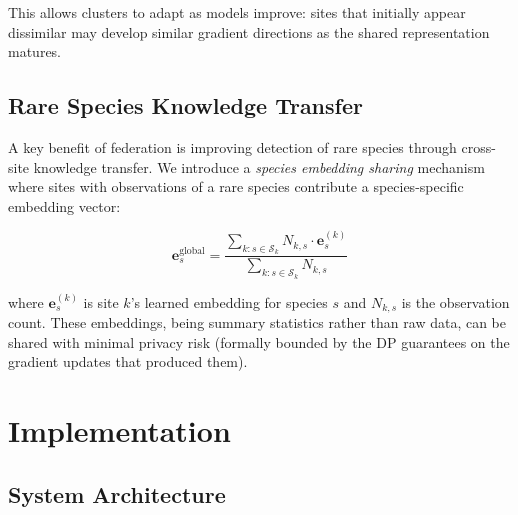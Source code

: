 \documentclass[11pt,a4paper]{article}
\begin{document}
This allows clusters to adapt as models improve: sites that initially appear dissimilar may develop similar gradient directions as the shared representation matures.

\subsection{Rare Species Knowledge Transfer}

A key benefit of federation is improving detection of rare species through cross-site knowledge transfer.
We introduce a \emph{species embedding sharing} mechanism where sites with observations of a rare species contribute a species-specific embedding vector:

\begin{equation}
    \mathbf{e}_s^{\text{global}} = \frac{\sum_{k: s \in \mathcal{S}_k} N_{k,s} \cdot \mathbf{e}_s^{(k)}}{\sum_{k: s \in \mathcal{S}_k} N_{k,s}}
\end{equation}

\noindent where $\mathbf{e}_s^{(k)}$ is site $k$'s learned embedding for species $s$ and $N_{k,s}$ is the observation count.
These embeddings, being summary statistics rather than raw data, can be shared with minimal privacy risk (formally bounded by the DP guarantees on the gradient updates that produced them).

\section{Implementation}
\label{sec:implementation}

\subsection{System Architecture}
\end{document}

